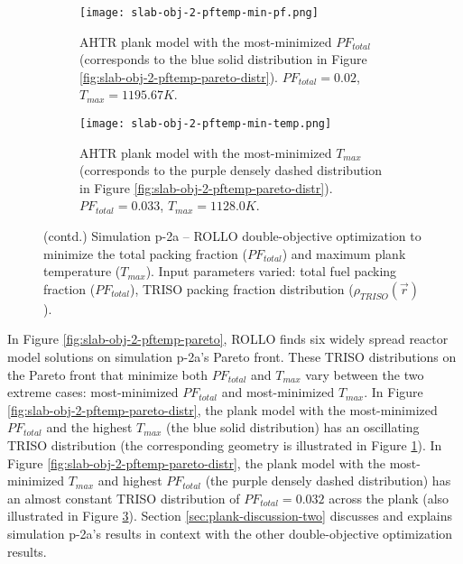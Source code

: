\begin{figure}[htbp!]
    \ContinuedFloat
    \begin{subfigure}{\textwidth}
        \texttt{[image: slab-obj-2-pftemp-min-pf.png]}
        \caption{\gls{AHTR} plank model with the most-minimized $PF_{total}$
        (corresponds to the blue solid distribution in Figure 
        \ref{fig:slab-obj-2-pftemp-pareto-distr}). $PF_{total} = 0.02$, 
        $T_{max} = 1195.67K$.}
        \label{fig:slab-obj-2-pftemp-min-pf} 
    \end{subfigure}
    \begin{subfigure}{\textwidth}
        \texttt{[image: slab-obj-2-pftemp-min-temp.png]}
        \caption{\gls{AHTR} plank model with the most-minimized $T_{max}$
        (corresponds to the purple densely dashed distribution in Figure 
        \ref{fig:slab-obj-2-pftemp-pareto-distr}). $PF_{total} = 0.033$, 
        $T_{max} = 1128.0K$.}
        \label{fig:slab-obj-2-pftemp-min-temp} 
    \end{subfigure}
    \caption{(contd.) Simulation p-2a -- ROLLO double-objective optimization to minimize 
    the total packing fraction ($PF_{total}$) and maximum plank temperature ($T_{max}$). 
    Input parameters varied: total fuel packing fraction ($PF_{total}$), 
    \gls{TRISO} packing fraction distribution ($\rho_{TRISO}(\vec{r})$).}
\end{figure}

In Figure \ref{fig:slab-obj-2-pftemp-pareto}, \gls{ROLLO} finds six widely spread 
reactor model solutions on simulation p-2a's Pareto front. 
These \gls{TRISO} distributions on the Pareto front that minimize both $PF_{total}$ and 
$T_{max}$ vary between the two extreme cases: 
most-minimized $PF_{total}$ and most-minimized $T_{max}$. 
In Figure \ref{fig:slab-obj-2-pftemp-pareto-distr}, the plank model with the
most-minimized $PF_{total}$ and the highest $T_{max}$ (the blue solid distribution) 
has an oscillating TRISO distribution (the corresponding geometry is illustrated in
Figure \ref{fig:slab-obj-2-pftemp-min-pf}).
In Figure \ref{fig:slab-obj-2-pftemp-pareto-distr}, the plank model with the 
most-minimized $T_{max}$ and highest $PF_{total}$ (the purple densely dashed distribution)
has an almost constant TRISO distribution of $PF_{total}=0.032$ across the plank (also 
illustrated in Figure \ref{fig:slab-obj-2-pftemp-min-temp}). 
Section \ref{sec:plank-discussion-two} discusses and explains simulation p-2a's results
in context with the other double-objective optimization results.

